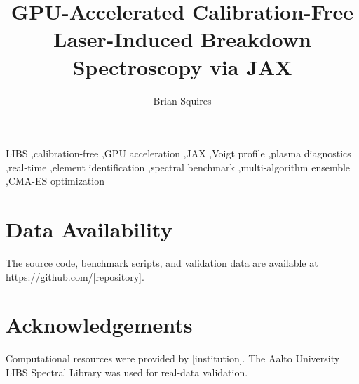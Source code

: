 \documentclass[preprint,12pt,authoryear]{elsarticle}
\begin{document}
\begin{frontmatter}

\title{GPU-Accelerated Calibration-Free Laser-Induced Breakdown Spectroscopy via JAX}

\author[inst1]{Brian Squires}

\begin{keyword}
LIBS \sep calibration-free \sep GPU acceleration \sep JAX \sep Voigt profile \sep plasma diagnostics \sep real-time \sep element identification \sep spectral benchmark \sep multi-algorithm ensemble \sep CMA-ES optimization
\end{keyword}



\end{frontmatter}







\section*{Data Availability}

The source code, benchmark scripts, and validation data are available at \url{https://github.com/[repository]}.

\section*{Acknowledgements}

Computational resources were provided by [institution]. The Aalto University LIBS Spectral Library was used for real-data validation.



\end{document}
